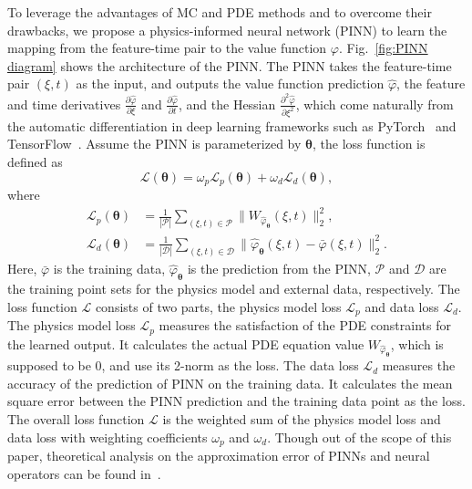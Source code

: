 \documentclass[letterpaper]{article} %
\newcommand{\todo}[1]{\textcolor{blue}{[TODO: #1]}}
\begin{document}
To leverage the advantages of MC and PDE methods and to overcome their drawbacks, we propose a physics-informed neural network (PINN) to learn the mapping from the feature-time pair to the value function $\varphi$.
Fig.~\ref{fig:PINN diagram} shows the architecture of the PINN. The PINN takes the feature-time pair $(\xi,t)$ as the input, and outputs the value function prediction $\hat{\varphi}$, the feature and time derivatives $ \frac{\partial \hat \varphi}{\partial \xi}$ and $ \frac{\partial \hat \varphi}{\partial t}$, and the Hessian $ \frac{\partial^2 \hat \varphi}{\partial \xi^2}$, which come naturally from the automatic differentiation in deep learning frameworks such as PyTorch~\cite{paszke2019pytorch} and TensorFlow~\cite{abadi2016tensorflow}.
Assume the PINN is parameterized by $\boldsymbol\theta$, the loss function is defined as
\begin{equation}
\label{eq:PINN overall loss function}
    \mathcal{L}(\boldsymbol\theta) = \omega_p \mathcal{L}_p(\boldsymbol\theta) + \omega_d \mathcal{L}_d(\boldsymbol\theta),
\end{equation}
where
\begin{equation}
\label{eq:PINN loss functions}
\begin{aligned}
    \mathcal{L}_p(\boldsymbol\theta) & = \frac{1}{|\mathcal{P}|} \sum_{(\xi,t) \in \mathcal{P}} \|W_{\hat{\varphi}_{\boldsymbol\theta}}(\xi,t)\|_2^2, \\
    \mathcal{L}_d(\boldsymbol\theta) & = \frac{1}{|\mathcal{D}|} \sum_{(\xi,t) \in \mathcal{D}} \|\hat{\varphi}_{\boldsymbol\theta}(\xi,t) - \bar{\varphi}(\xi,t)\|_2^2.
\end{aligned}
\end{equation}
Here, $\bar{\varphi}$ is the training data, $\hat{\varphi}_{\boldsymbol\theta}$ is the prediction from the PINN, $\mathcal{P}$ and $\mathcal{D}$ are the training point sets for the physics model and external data, respectively. The loss function $\mathcal{L}$ consists of two parts, the physics model loss $\mathcal{L}_p$ and data loss $\mathcal{L}_d$. The physics model loss $\mathcal{L}_p$ measures the satisfaction of the PDE constraints for the learned output. It calculates the actual PDE equation value $W_{\hat{\varphi}_{\boldsymbol\theta}}$, which is supposed to be $0$, and use its 2-norm as the loss. The data loss $\mathcal{L}_d$ measures the accuracy of the prediction of PINN on the training data. It calculates the mean square error between the PINN prediction and the training data point as the loss. The overall loss function $\mathcal{L}$ is the weighted sum of the physics model loss and data loss with weighting coefficients $\omega_p$ and $\omega_d$.
Though out of the scope of this paper, theoretical analysis on the approximation error of PINNs and neural operators can be found in~\cite{wang2023generalizable, lu2021learning, kovachki2021universal}. 
\end{document}
